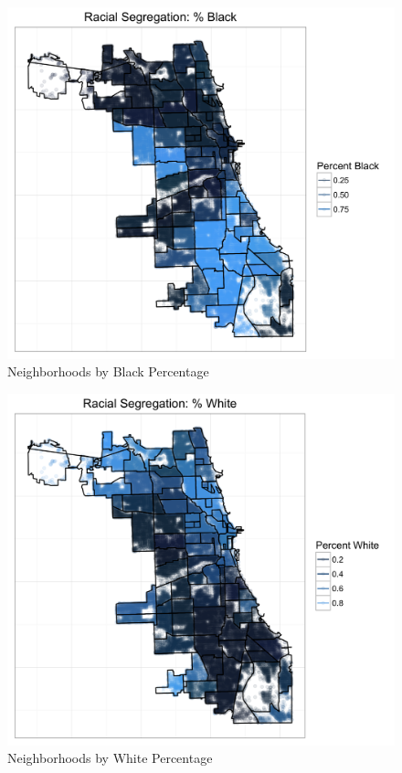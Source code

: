 \documentclass{report}
\begin{document}
\begin{figure}[h!]
  \includegraphics[scale=.2]{pct_black_plot}
  \caption{Neighborhoods by Black Percentage}
  \label{fig:black}
\end{figure}

\begin{figure}[h!]
  \includegraphics[scale=.2]{pct_white_plot}
  \caption{Neighborhoods by White Percentage}
  \label{fig:white}
\end{figure}
\end{document}
